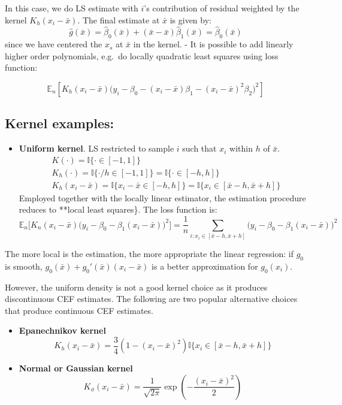 \documentclass[12pt,]{book}
\providecommand{\tightlist}{%
  \setlength{\itemsep}{0pt}\setlength{\parskip}{0pt}}
\begin{document}
In this case, we do LS estimate with \(i\)'s contribution of residual weighted by the kernel \(K_h (x_i - \bar{x})\). The final estimate at \(\bar{x}\) is given by:
\[
  \hat{g} (\bar{x}) = \hat{\beta}_0 (\bar{x}) + (\bar{x} - \bar{x}) \hat{\beta}_1 (\bar{x}) = \hat{\beta}_0 (\bar{x})
\]
since we have centered the \(x_s\) at \(\bar{x}\) in the kernel.
- It is possible to add linearly higher order polynomials, e.g.~do locally quadratic least squares using loss function:

\[
  \mathbb E_n \left[ K_h (x_i - \bar{x}) \big(y_i - \beta_0 - (x_i - \bar{x}) \beta_1 - (x_i - \bar{x})^2 \beta_2 \big)^2 \right] 
\]

\hypertarget{kernel-examples}{%
\subsection{Kernel examples:}\label{kernel-examples}}

\begin{itemize}
\tightlist
\item
  \textbf{Uniform kernel}. LS restricted to sample \(i\) such that \(x_i\) within \(h\) of \(\bar{x}\).
  \[
  \begin{aligned}
  & K (\cdot) = \mathbb I\{ \cdot \in [-1, 1] \}  \\
  & K_h (\cdot) = \mathbb I\{ \cdot/h \in [-1, 1] \} = \mathbb I\{ \cdot \in [-h, h] \}  \\
  & K_h (x_i - \bar{x}) = \mathbb I\{ x_i - \bar{x} \in [-h, h] \}  = \mathbb I\{ x_i \in [\bar{x}-h, \bar{x} + h] \} 
  \end{aligned}
  \]
  Employed together with the locally linear estimator, the estimation procedure reduces to **local least squares\}. The loss function is:
  \[
  \mathbb E_n \Big[ K_n (x_i - \bar{x}) \big(y_i -\beta_0 - \beta_1 (x_i - \bar{x}) \big)^2 \Big] = \frac{1}{n} \sum_{i: x_i \in [\bar{x}-h, \bar{x} +h ]}  \big(y_i -\beta_0 - \beta_1 (x_i - \bar{x}) \big)^2
  \]
\end{itemize}

The more local is the estimation, the more appropriate the linear regression: if \(g_0\) is smooth, \(g_0(\bar{x}) + g_0'(\bar{x}) (x_i - \bar{x})\) is a better approximation for \(g_0 (x_i)\).

However, the uniform density is not a good kernel choice as it produces discontinuous CEF estimates. The following are two popular alternative choices that produce continuous CEF estimates.

\begin{itemize}
\item
  \textbf{Epanechnikov kernel}
  \[
    K_h(x_i - \bar{x}) = \frac { 3 } { 4 } \left( 1 - (x_i - \bar{x}) ^ { 2 } \right)  \mathbb I\{ x_i \in [\bar{x}-h, \bar{x} + h] \} 
  \]
\item
  \textbf{Normal or Gaussian kernel}
  \[
    K_\phi (x_i - \bar{x})  = \frac { 1 } { \sqrt { 2 \pi } } \exp \left( - \frac { (x_i - \bar{x}) ^ { 2 } } { 2 } \right)
  \]
\end{itemize}
\end{document}

